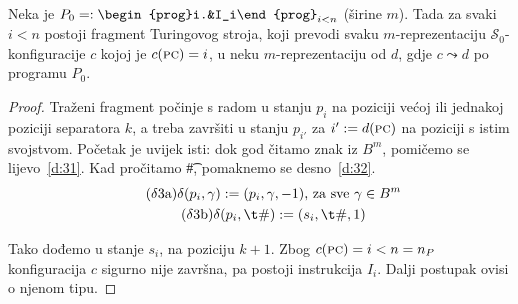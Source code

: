 \begin{lema}[{name=[{izvršavanje RAM-instrukcija na Turingovom stroju}]}]\label{lm:gadgets}
    Neka je $P_0=:\begin{prog}i.&I_i\end{prog}_{i<n}$ (širine $m$). Tada za svaki $i<n$ postoji fragment Turingovog stroja, koji prevodi svaku $m$-reprezentaciju $\mathcal S_0$-konfiguracije $c$ kojoj je $c(\textsc{pc})=i$, u neku $m$-reprezentaciju od $d$, gdje $c\leadsto d$ po programu $P_0$.
\end{lema}
\begin{proof}
Traženi fragment počinje s radom u stanju $p_i$ na poziciji većoj ili jednakoj poziciji separatora $k$, a treba završiti u stanju $p_{i'}$ za $i':=d(\textsc{pc})$ na poziciji s istim svojstvom. Početak je uvijek isti: dok god čitamo znak iz $B^m$, pomičemo se lijevo~\eqref{d:31}. Kad pročitamo \t\#, pomaknemo se desno~\eqref{d:32}. 
\begin{gather*}
\label{d:31}\tag{$\delta$3a}
    \delta(p_i,\gamma):=(p_i,\gamma,-1)\text{, za sve }\gamma\in B^m\\
\label{d:32}\tag{$\delta$3b}
    \delta(p_i,\t\#):=(s_i,\t\#,1)
\end{gather*}

Tako dođemo u stanje $s_i$, na poziciju $k+1$. Zbog $c(\textsc{pc})=i<n=n_P$ konfiguracija $c$ sigurno nije završna, pa postoji instrukcija $I_i$. Dalji postupak ovisi o njenom tipu.


\end{proof}
